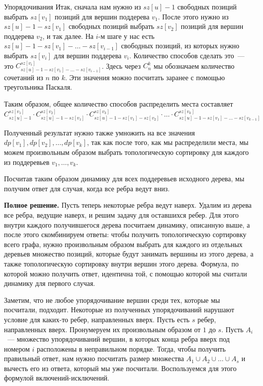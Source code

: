 \begin{tutorial}{Упорядочивания}
Итак, сначала нам нужно из $sz[u] - 1$ свободных позиций выбрать $sz[v_1]$ позиций для вершин поддерева $v_1$. После этого нужно из $sz[u] - 1 - sz[v_1]$ свободных позиций выбрать $sz[v_2]$ позиций для вершин поддерева $v_2$, и так далее. На $i$-м шаге у нас есть $sz[u] - 1 - sz[v_1] - \ldots - sz[v_{i - 1}]$ свободных позиций, из которых нужно выбрать $sz[v_i]$ для вершин поддерева $v_i$. Количество способов сделать это~--- это $C_{sz[u] - 1 - sz[v_1] - \ldots - sz[v_{i - 1}]}^{sz[v_i]}$. Здесь через $C_n^k$ мы обозначаем количество сочетаний из $n$ по $k$. Эти значения можно посчитать заранее с помощью треугольника Паскаля.

Таким образом, общее количество способов распределить места составляет
$$C_{sz[u] - 1}^{sz[v_1]} \cdot C_{sz[u] - 1 - sz[v_1]}^{sz[v_2]} \cdot C_{sz[u] - 1 - sz[v_1] - sz[v_2]}^{sz[v_3]} \cdot \ldots \cdot C_{sz[u] - 1 - sz[v_1] - \ldots - sz[v_{k - 1}]}^{sz[v_k]}$$

Полученный результат нужно также умножить на все значения $dp[v_1], dp[v_2], \ldots, dp[v_k]$, так как после того, как мы распределили места, мы можем произвольным образом выбрать топологическую сортировку для каждого из поддеревьев $v_1, \ldots, v_k$.

Посчитав таким образом динамику для всех поддеревьев исходного дерева, мы получим ответ для случая, когда все ребра ведут вниз.

\textbf{Полное решение.}
Пусть теперь некоторые ребра ведут наверх. Удалим из дерева все ребра, ведущие наверх, и решим задачу для оставшихся ребер. Для этого внутри каждого получившегося дерева посчитаем динамику, описанную выше,  а после этого скомбинируем ответы: чтобы получить топологическую сортировку всего графа, нужно произвольным образом выбрать для каждого из отдельных деревьев множество позиций, которые будут занимать вершины из этого дерева, а также топологическую сортировку внутри вершин этого дерева. Формула, по которой можно получить ответ, идентична той, с помощью которой мы считали динамику для первого случая.

Заметим, что не любое упорядочивание вершин среди тех, которые мы посчитали, подходит. Некоторые из полученных упорядочиваний нарушают условие для каких-то ребер, направленных вверх. Пусть есть $s$ ребер, направленных вверх. Пронумеруем их произвольным образом от $1$ до $s$. Пусть $A_i$~--- множество упорядочиваний вершин, в которых конца ребра вверх под номером $i$ расположены в неправильном порядке. Тогда, чтобы получить правильный ответ, нам нужно посчитать размер множества $A_1 \cup A_2 \cup \ldots \cup A_s$ и вычесть его из ответа, который мы уже посчитали. Воспользуемся для этого формулой включений-исключений.


\end{tutorial}
